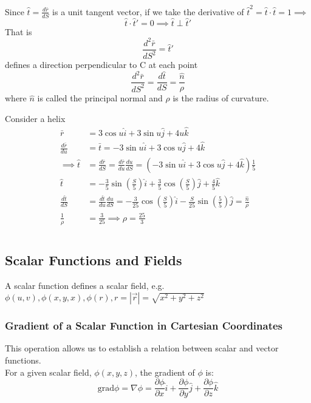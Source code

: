 \documentclass[a4paper, 11pt, normalem]{report}
\newcommand\p{\partial}
\begin{document}
Since $\hat{t} = \frac{d\bar{r}}{dS}$ is a unit tangent vector, if we take the derivative of $\hat{t}^2 = \hat{t} \cdot \hat{t} = 1 \implies$
\begin{equation*}
    \hat{t} \cdot \hat{t}' = 0 \implies \hat{t} \perp \hat{t}'
\end{equation*}
That is
\begin{equation*}
    \frac{d^2\bar{r}}{dS^2} = \hat{t}'
\end{equation*}
defines a direction perpendicular to C at each point
\begin{equation*}
    \frac{d^2\bar{r}}{dS^2} = \frac{d\hat{t}}{dS} = \frac{\hat{n}}{\rho}
\end{equation*}
where $\hat{n}$ is called the principal normal and $\rho$ is the radius of curvature.

Consider a helix
\begin{align*}
    \bar{r} &= 3\cos u\hat{i} + 3\sin u \hat{j} + 4u\hat{k} \\
    \frac{d\bar{r}}{du} &= \bar{t} = -3\sin u\hat{i} + 3\cos u\hat{j} + 4\hat{k}\\
    \implies \hat{t} &= \frac{d\bar{r}}{dS} = \frac{d\bar{r}}{du}\frac{du}{dS} = (-3\sin u\hat{i} + 3\cos u\hat{j} + 4\hat{k})\frac{1}{5} \\
    \hat{t} &= - \frac{3}{5} \sin(\frac{S}{5}) \hat{i} + \frac{3}{5} \cos (\frac{S}{5})\hat{j} + \frac{4}{5}\hat{k} \\
    \frac{d\hat{t}}{dS} &= \frac{d\hat{t}}{du}\frac{du}{dS} = -\frac{3}{25}\cos(\frac{S}{5})\hat{i} -\frac{S}{25}\sin(\frac{5}{5})\hat{j} = \frac{\hat{n}}{\rho} \\
    \frac{1}{\rho} &= \frac{3}{25} \implies \rho = \frac{25}{3}
\end{align*}

\chapter{}
\section{Scalar Functions and Fields}
A scalar function defines a scalar field, e.g. $\phi(u, v), \phi(x,y,x), \phi(r), r = |\vec{r}| = \sqrt{x^2 + y^2 + z^2}$

\subsection{Gradient of a Scalar Function in Cartesian Coordinates}
This operation allows us to establish a relation between scalar and vector functions. \\
For a given scalar field, $\phi(x,y,z)$, the gradient of $\phi$ is:
\begin{equation*}
    \text{grad}\phi = \nabla\phi = \frac{\p \phi}{\p x}\hat{i} + \frac{\p\phi}{\p y}\hat{j} + \frac{\p\phi}{\p z}\hat{k}
\end{equation*}
\end{document}
